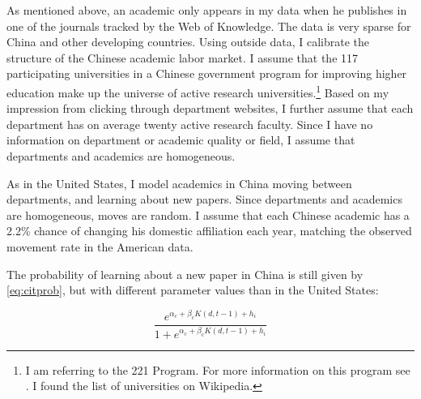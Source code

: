 \documentclass[]{article}
\begin{document}
As mentioned above, an academic only appears in my data when he
publishes in one of the journals tracked by the Web of Knowledge.  The
data is very sparse for China and other developing countries.  Using outside data,
I calibrate the structure of the Chinese 
academic labor market.  I assume that the 117 participating universities in
a Chinese government program for improving higher education make up the universe
of active research universities.\footnote{I am referring to the 221 Program.
    For more information on this program see \citet{lixu2004china}.  I found the 
list of universities on Wikipedia.}
   Based on my impression from clicking through 
department websites, I further assume that each department has on average
twenty active research faculty.  Since I have no information on department or academic 
quality or field, I assume that departments and academics are homogeneous.

As in the United States, I model academics in China moving between departments,
and learning about new papers.  Since departments and academics are 
homogeneous, moves are random.  I assume that each Chinese academic has a 2.2\%
chance of changing his domestic affiliation each year, matching the observed 
movement rate in the American data.

The probability of learning about a new paper in China is still given by
\eqref{eq:citprob}, but with different parameter values than in the United
States:  

\begin{equation}
    \frac{e^{\alpha_c + \beta_c K(d,t-1) + h_i}}{1 + e^{\alpha_c + \beta_c K(d,t-1) + h_i}}
    \label{eq:citprob_china}
\end{equation}
\end{document}
